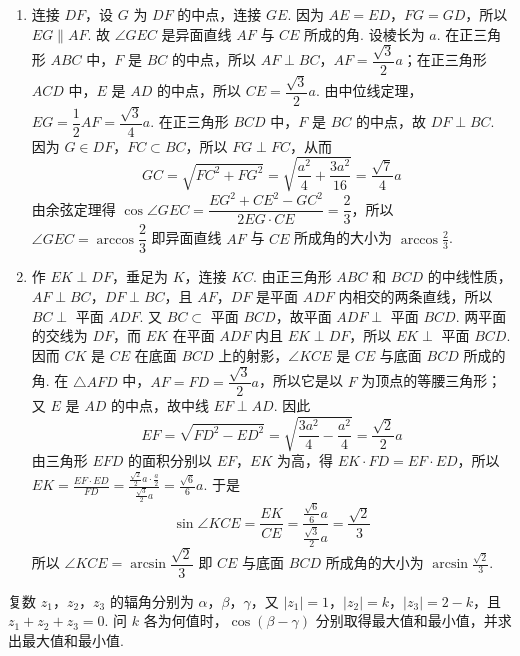 \documentclass[UTF8,a4paper,oneside,11pt]{ctexbook}
\begin{document}
\begin{solution}
\begin{enumerate}
\item 连接 \(DF\)，设 \(G\) 为 \(DF\) 的中点，连接 \(GE\). 因为 \(AE=ED\)，\(FG=GD\)，所以 \(EG\parallel AF\). 故 \(\angle GEC\) 是异面直线 \(AF\) 与 \(CE\) 所成的角. 设棱长为 \(a\). 在正三角形 \(ABC\) 中，\(F\) 是 \(BC\) 的中点，所以 \(AF\perp BC\)，\(AF=\dfrac{\sqrt{3}}{2}a\)；在正三角形 \(ACD\) 中，\(E\) 是 \(AD\) 的中点，所以 \(CE=\dfrac{\sqrt{3}}{2}a\). 由中位线定理，\(EG=\dfrac{1}{2}AF=\dfrac{\sqrt{3}}{4}a\).
在正三角形 \(BCD\) 中，\(F\) 是 \(BC\) 的中点，故 \(DF\perp BC\). 因为 \(G\in DF\)，\(FC\subset BC\)，所以 \(FG\perp FC\)，从而
\[
GC=\sqrt{FC^2+FG^2}=\sqrt{\frac{a^2}{4}+\frac{3a^2}{16}}=\frac{\sqrt{7}}{4}a
\]
由余弦定理得 \(\cos\angle GEC=\dfrac{EG^2+CE^2-GC^2}{2EG\cdot CE}=\dfrac{2}{3}\)，所以 \(\angle GEC=\arccos\dfrac{2}{3}\)
即异面直线 \(AF\) 与 \(CE\) 所成角的大小为 \(\arccos\frac{2}{3}\).

\item 作 \(EK\perp DF\)，垂足为 \(K\)，连接 \(KC\). 由正三角形 \(ABC\) 和 \(BCD\) 的中线性质，\(AF\perp BC\)，\(DF\perp BC\)，且 \(AF\)，\(DF\) 是平面 \(ADF\) 内相交的两条直线，所以 \(BC\perp\) 平面 \(ADF\). 又 \(BC\subset\) 平面 \(BCD\)，故平面 \(ADF\perp\) 平面 \(BCD\). 两平面的交线为 \(DF\)，而 \(EK\) 在平面 \(ADF\) 内且 \(EK\perp DF\)，所以 \(EK\perp\) 平面 \(BCD\). 因而 \(CK\) 是 \(CE\) 在底面 \(BCD\) 上的射影，\(\angle KCE\) 是 \(CE\) 与底面 \(BCD\) 所成的角.
在 \(\triangle AFD\) 中，\(AF=FD=\dfrac{\sqrt{3}}{2}a\)，所以它是以 \(F\) 为顶点的等腰三角形；又 \(E\) 是 \(AD\) 的中点，故中线 \(EF\perp AD\). 因此
\[
EF=\sqrt{FD^2-ED^2}=\sqrt{\frac{3a^2}{4}-\frac{a^2}{4}}=\frac{\sqrt{2}}{2}a
\]
由三角形 \(EFD\) 的面积分别以 \(EF\)，\(EK\) 为高，得 \(EK\cdot FD=EF\cdot ED\)，所以
\(EK=\frac{EF\cdot ED}{FD}=\frac{\frac{\sqrt{2}}{2}a\cdot\frac{a}{2}}{\frac{\sqrt{3}}{2}a}=\frac{\sqrt{6}}{6}a\).
于是
\[
\sin\angle KCE=\frac{EK}{CE}=\frac{\frac{\sqrt{6}}{6}a}{\frac{\sqrt{3}}{2}a}=\frac{\sqrt{2}}{3}
\]
所以 \(\angle KCE=\arcsin\dfrac{\sqrt{2}}{3}\)
即 \(CE\) 与底面 \(BCD\) 所成角的大小为 \(\arcsin\frac{\sqrt{2}}{3}\).
\end{enumerate}
\end{solution}

\begin{problem}
复数 \(z_1\)，\(z_2\)，\(z_3\) 的辐角分别为 \(\alpha\)，\(\beta\)，\(\gamma\)，又 \(|z_1|=1\)，\(|z_2|=k\)，\(|z_3|=2-k\)，且 \(z_1+z_2+z_3=0\). 问 \(k\) 各为何值时，\(\cos(\beta-\gamma)\) 分别取得最大值和最小值，并求出最大值和最小值.
\end{problem}
\end{document}
